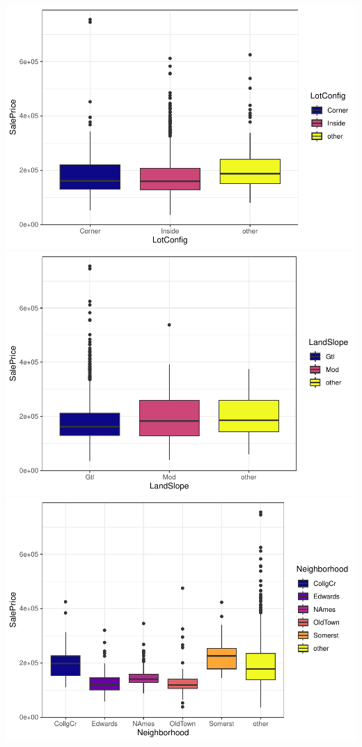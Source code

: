\documentclass[
]{article}
\begin{document}
\includegraphics{report_files/figure-latex/categorical variables-4.pdf}
\includegraphics{report_files/figure-latex/categorical variables-5.pdf}
\includegraphics{report_files/figure-latex/categorical variables-6.pdf}
\end{document}
